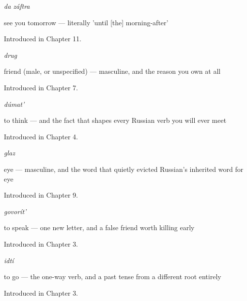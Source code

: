 \noindent\begin{minipage}[t]{\linewidth}
\raggedright
\textbf{ }\enspace\emph{da záftra}\par
\small see you tomorrow — literally 'until {[}the{]} morning-after'\par
\footnotesize Introduced in Chapter 11.
\end{minipage}\par\medskip

\noindent\begin{minipage}[t]{\linewidth}
\raggedright
\textbf{}\enspace\emph{drug}\par
\small friend (male, or unspecified) — masculine, and the reason you own  at all\par
\footnotesize Introduced in Chapter 7.
\end{minipage}\par\medskip

\noindent\begin{minipage}[t]{\linewidth}
\raggedright
\textbf{}\enspace\emph{dúmat'}\par
\small to think — and the fact that shapes every Russian verb you will ever meet\par
\footnotesize Introduced in Chapter 4.
\end{minipage}\par\medskip

\noindent\begin{minipage}[t]{\linewidth}
\raggedright
\textbf{}\enspace\emph{glaz}\par
\small eye — masculine, and the word that quietly evicted Russian's inherited word for eye\par
\footnotesize Introduced in Chapter 9.
\end{minipage}\par\medskip

\noindent\begin{minipage}[t]{\linewidth}
\raggedright
\textbf{}\enspace\emph{govorít'}\par
\small to speak — one new letter, and a false friend worth killing early\par
\footnotesize Introduced in Chapter 3.
\end{minipage}\par\medskip

\noindent\begin{minipage}[t]{\linewidth}
\raggedright
\textbf{}\enspace\emph{idtí}\par
\small to go — the one-way verb, and a past tense from a different root entirely\par
\footnotesize Introduced in Chapter 3.
\end{minipage}\par\medskip

